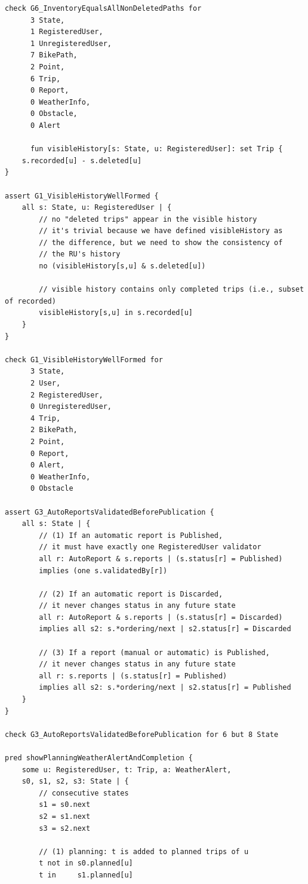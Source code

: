 \begin{lstlisting}[caption=Complete Alloy Formalization.]
check G6_InventoryEqualsAllNonDeletedPaths for
      3 State,
      1 RegisteredUser,
      1 UnregisteredUser,
      7 BikePath,
      2 Point,
      6 Trip,
      0 Report,
      0 WeatherInfo,
      0 Obstacle,
      0 Alert

      fun visibleHistory[s: State, u: RegisteredUser]: set Trip {
    s.recorded[u] - s.deleted[u]
}

assert G1_VisibleHistoryWellFormed {
    all s: State, u: RegisteredUser | {
        // no "deleted trips" appear in the visible history
        // it's trivial because we have defined visibleHistory as 
        // the difference, but we need to show the consistency of 
        // the RU's history
        no (visibleHistory[s,u] & s.deleted[u])		

        // visible history contains only completed trips (i.e., subset of recorded)
        visibleHistory[s,u] in s.recorded[u]
    }
}

check G1_VisibleHistoryWellFormed for
      3 State,
      2 User,
      2 RegisteredUser,
      0 UnregisteredUser,
      4 Trip,
      2 BikePath,
      2 Point,
      0 Report,
      0 Alert,
      0 WeatherInfo,
      0 Obstacle

assert G3_AutoReportsValidatedBeforePublication {
    all s: State | {    
        // (1) If an automatic report is Published, 
        // it must have exactly one RegisteredUser validator
        all r: AutoReport & s.reports | (s.status[r] = Published) 
        implies (one s.validatedBy[r])
    
        // (2) If an automatic report is Discarded, 
        // it never changes status in any future state
        all r: AutoReport & s.reports | (s.status[r] = Discarded) 
        implies all s2: s.*ordering/next | s2.status[r] = Discarded
    
        // (3) If a report (manual or automatic) is Published, 
        // it never changes status in any future state
        all r: s.reports | (s.status[r] = Published) 
        implies all s2: s.*ordering/next | s2.status[r] = Published
    }
}

check G3_AutoReportsValidatedBeforePublication for 6 but 8 State

pred showPlanningWeatherAlertAndCompletion {
    some u: RegisteredUser, t: Trip, a: WeatherAlert, 
    s0, s1, s2, s3: State | {
        // consecutive states
        s1 = s0.next
        s2 = s1.next
        s3 = s2.next
        
        // (1) planning: t is added to planned trips of u
        t not in s0.planned[u]
        t in     s1.planned[u]
        

\end{lstlisting}

